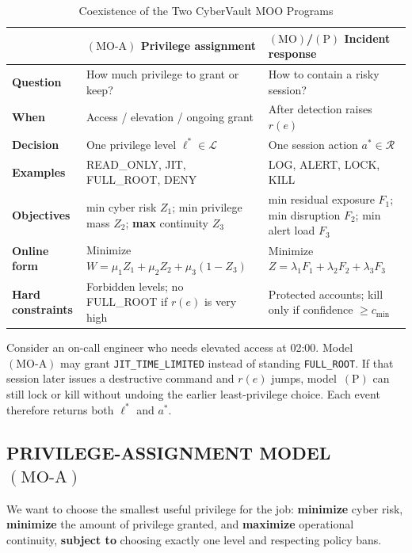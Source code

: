 \documentclass{ieeeaccess}
\begin{document}
\begin{table}[!t]
\caption{Coexistence of the Two CyberVault MOO Programs}
\label{tab:moo-coexist}
\centering
\scriptsize
\begin{tabular}{@{}p{} p{} p{}@{}}
\toprule
 & \textbf{$(\mathrm{MO}\text{-}\mathrm{A})$ Privilege assignment} & \textbf{$(\mathrm{MO})$/$(\mathrm{P})$ Incident response} \\
\midrule
\textbf{Question} & How much privilege to grant or keep? & How to contain a risky session? \\
\textbf{When} & Access / elevation / ongoing grant & After detection raises $r(e)$ \\
\textbf{Decision} & One privilege level $\ell^*\in\mathcal{L}$ & One session action $a^*\in\mathcal{R}$ \\
\textbf{Examples} & READ\_ONLY, JIT, FULL\_ROOT, DENY & LOG, ALERT, LOCK, KILL \\
\textbf{Objectives} & min cyber risk $Z_1$; min privilege mass $Z_2$; \textbf{max} continuity $Z_3$ & min residual exposure $F_1$; min disruption $F_2$; min alert load $F_3$ \\
\textbf{Online form} & Minimize $W=\mu_1 Z_1+\mu_2 Z_2+\mu_3(1-Z_3)$ & Minimize $Z=\lambda_1 F_1+\lambda_2 F_2+\lambda_3 F_3$ \\
\textbf{Hard constraints} & Forbidden levels; no FULL\_ROOT if $r(e)$ is very high & Protected accounts; kill only if confidence $\geq c_{\min}$ \\
\bottomrule
\end{tabular}
\end{table}

Consider an on-call engineer who needs elevated access at 02:00. Model~$(\mathrm{MO}\text{-}\mathrm{A})$ may grant \texttt{JIT\_TIME\_LIMITED} instead of standing \texttt{FULL\_ROOT}. If that session later issues a destructive command and $r(e)$ jumps, model~$(\mathrm{P})$ can still lock or kill without undoing the earlier least-privilege choice. Each event therefore returns both $\ell^*$ and $a^*$.

\subsection{PRIVILEGE-ASSIGNMENT MODEL $(\mathrm{MO}\text{-}\mathrm{A})$}

We want to choose the smallest useful privilege for the job: \textbf{minimize} cyber risk, \textbf{minimize} the amount of privilege granted, and \textbf{maximize} operational continuity, \textbf{subject to} choosing exactly one level and respecting policy bans.
\end{document}
